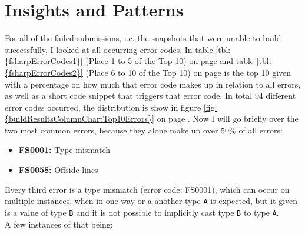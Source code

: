 \newpage %
\section{Insights and Patterns} %




For all of the failed submissions, i.e. the snapshots that were unable to build successfully, I looked at all occurring error codes.
In table \ref{tbl:{fsharpErrorCodes1}} (Place 1 to 5 of the Top 10) on page 
and table \ref{tbl:{fsharpErrorCodes2}} (Place 6 to 10 of the Top 10) on page  is the top 10 given with a percentage on how much that error code makes up in relation to all errors,
as well as a short code snippet that triggers that error code. In total \(94\) different error codes occurred, the distribution is show in figure \ref{fig:{buildResultsColumnChartTop10Errors}} on page .
Now I will go briefly over the two most common errors, because they alone make up over \(50\%\) of all errors:
\begin{itemize}[nosep]
    \item \textbf{FS0001:} Type mismatch
    \item \textbf{FS0058:} Offside lines
\end{itemize}
Every third error is a type mismatch (error code: FS0001), which can occur on multiple instances, when in one way or a another type \texttt{A} is expected, but it given is a value of type \texttt{B} and it is not possible to implicitly cast type \texttt{B} to type \texttt{A}.\\
A few instances of that being:
\pagebreak
